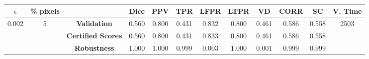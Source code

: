 \begin{longtable}{ c  c | c | c  c  c  c  c  c  c c c}
\toprule \textbf{$\epsilon$} & \textbf{\% pixels} & & \textbf{Dice} & \textbf{PPV} & \textbf{TPR} & \textbf{LFPR} & \textbf{LTPR} & \textbf{VD} & \textbf{CORR} & \textbf{SC} & \textbf{V. Time} \\
\midrule 
\multirow{3}{*}{0.002}  & \multirow{3}{*}{5} &\textbf{Validation} & 0.560 & 0.800 & 0.431 & 0.832 & 0.800 & 0.461 & 0.586 & 0.558 & \multirow{3}{*}{2503} \\
 & & \textbf{Certified Scores} & 0.560 & 0.800 & 0.431 & 0.833 & 0.800 & 0.461 & 0.586 & 0.558 & \\
& & \textbf{Robustness} & 1.000 & 1.000 & 0.999 & 0.003 & 1.000 & 0.001 & 0.999 & 0.999 & \\
\end{longtable}